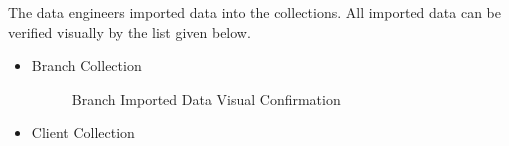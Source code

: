 \documentclass[a4Paper,12pt]{report}
\begin{document}
The data engineers imported data into the collections. All imported data can be verified visually by the list given below.
\begin{itemize}
\item Branch Collection
\begin{figure}[H]
\centering
{}
\caption{Branch Imported Data Visual Confirmation}
\end{figure}
\item Client Collection
\begin{figure}[H]
\centering
{}

\end{figure}
\end{itemize}
\end{document}
